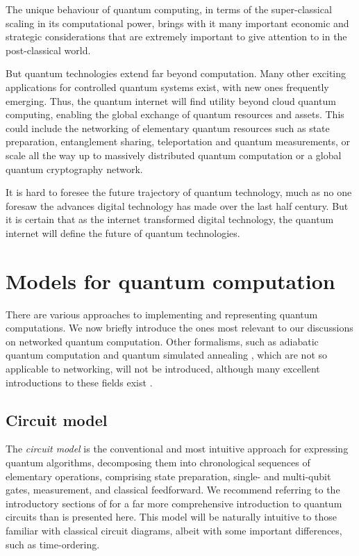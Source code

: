 \documentclass[aps, rmp, twocolumn, amsmath, amssymb, nofootinbib, superscriptaddress, longbibliography, floatfix, table-of-contents, eqsecnum]{revtex4-1}
\begin{document}
The unique behaviour of quantum computing, in terms of the super-classical scaling in its computational power, brings with it many important economic and strategic considerations that are extremely important to give attention to in the post-classical world.

But quantum technologies extend far beyond computation. Many other exciting applications for controlled quantum systems exist, with new ones frequently emerging. Thus, the quantum internet will find utility beyond cloud quantum computing, enabling the global exchange of quantum resources and assets. This could include the networking of elementary quantum resources such as state preparation, entanglement sharing, teleportation and quantum measurements, or scale all the way up to massively distributed quantum computation or a global quantum cryptography network.

It is hard to foresee the future trajectory of quantum technology, much as no one foresaw the advances digital technology has made over the last half century. But it is certain that as the internet transformed digital technology, the quantum internet will define the future of quantum technologies.

%
%

\section{Models for quantum computation} \label{sec:models_QC} 

There are various approaches to implementing and representing quantum computations. We now briefly introduce the ones most relevant to our discussions on networked quantum computation. Other formalisms, such as adiabatic quantum computation \cite{???} and quantum simulated annealing \cite{???}, which are not so applicable to networking, will not be introduced, although many excellent introductions to these fields exist \cite{???}.

%
%

\subsection{Circuit model} \label{sec:circuit_model} 

The \textit{circuit model} is the conventional and most intuitive approach for expressing quantum algorithms, decomposing them into chronological sequences of elementary operations, comprising state preparation, single- and multi-qubit gates, measurement, and classical feedforward. We recommend referring to the introductory sections of \cite{bib:NielsenChuang00} for a far more comprehensive introduction to quantum circuits than is presented here. This model will be naturally intuitive to those familiar with classical circuit diagrams, albeit with some important differences, such as time-ordering.
\end{document}
